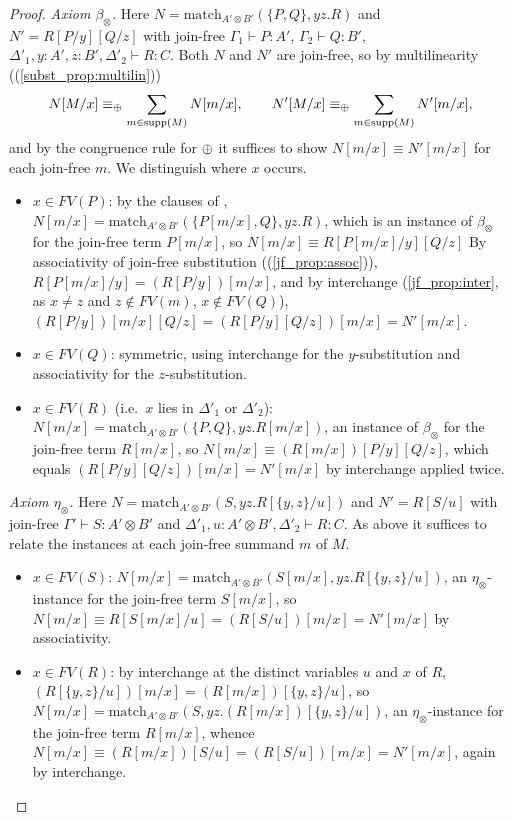 \begin{proof}
\emph{Axiom $\beta_{\otimes}$.}
Here $N = \text{match}_{A' \otimes B'}(\{P, Q\}, yz.R)$ and $N' = R[P/y][Q/z]$ with join-free $\Gamma_1 \vdash P : A'$, $\Gamma_2 \vdash Q : B'$, $\Delta'_1, y : A', z : B', \Delta'_2 \vdash R : C$.
Both $N$ and $N'$ are join-free, so by multilinearity ((\ref{subst_prop:multilin}))
\[
N[M/x] \equiv_{\mathbin{\oplus}} \sum_{m \in \operatorname{supp}(M)} N[m/x],
\qquad
N'[M/x] \equiv_{\mathbin{\oplus}} \sum_{m \in \operatorname{supp}(M)} N'[m/x],
\]
and by the congruence rule for $\mathbin{\oplus}$ it suffices to show $N[m/x] \equiv N'[m/x]$ for each join-free $m$.
We distinguish where $x$ occurs.
\begin{itemize}
  \item $x \in FV(P)$: by the clauses of , $N[m/x] = \text{match}_{A' \otimes B'}(\{P[m/x], Q\}, yz.R)$, which is an instance of $\beta_{\otimes}$ for the join-free term $P[m/x]$, so
  $N[m/x] \equiv R[P[m/x]/y][Q/z]$
  By associativity of join-free substitution ((\ref{jf_prop:assoc})), $R[P[m/x]/y] = (R[P/y])[m/x]$, and by interchange (\ref{jf_prop:inter}, as $x \neq z$ and $z \notin FV(m)$, $x \notin FV(Q)$),
  $(R[P/y])[m/x][Q/z] = (R[P/y][Q/z])[m/x] = N'[m/x]$.
  \item $x \in FV(Q)$: symmetric, using interchange for the $y$-substitution and associativity for the $z$-substitution.
  \item $x \in FV(R)$ (i.e.\ $x$ lies in $\Delta'_1$ or $\Delta'_2$): $N[m/x] = \text{match}_{A' \otimes B'}(\{P, Q\}, yz.R[m/x])$, an instance of $\beta_{\otimes}$ for the join-free term $R[m/x]$, so $N[m/x] \equiv (R[m/x])[P/y][Q/z]$, which equals $(R[P/y][Q/z])[m/x] = N'[m/x]$ by interchange applied twice.
\end{itemize}

\emph{Axiom $\eta_{\otimes}$.}
Here $N = \text{match}_{A' \otimes B'}(S, yz.R[\{y,z\}/u])$ and $N' = R[S/u]$ with join-free $\Gamma' \vdash S : A' \otimes B'$ and $\Delta'_1, u : A' \otimes B', \Delta'_2 \vdash R : C$.
As above it suffices to relate the instances at each join-free summand $m$ of $M$.
\begin{itemize}
  \item $x \in FV(S)$: $N[m/x] = \text{match}_{A' \otimes B'}(S[m/x], yz.R[\{y,z\}/u])$, an $\eta_{\otimes}$-instance for the join-free term $S[m/x]$, so $N[m/x] \equiv R[S[m/x]/u] = (R[S/u])[m/x] = N'[m/x]$ by associativity.
  \item $x \in FV(R)$: by interchange at the distinct variables $u$ and $x$ of $R$, $(R[\{y,z\}/u])[m/x] = (R[m/x])[\{y,z\}/u]$, so $N[m/x] = \text{match}_{A' \otimes B'}(S, yz.(R[m/x])[\{y,z\}/u])$, an $\eta_{\otimes}$-instance for the join-free term $R[m/x]$, whence $N[m/x] \equiv (R[m/x])[S/u] = (R[S/u])[m/x] = N'[m/x]$, again by interchange.
\end{itemize}


\end{proof}
